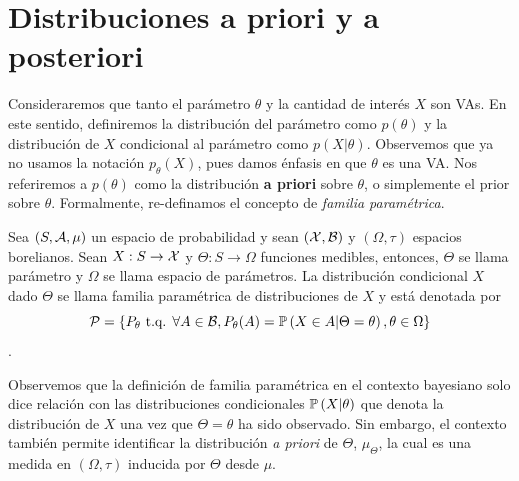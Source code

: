  \section{Distribuciones a priori y a posteriori} 
 \label{sec:distribuciones_a_priori_y_a_posteriori}
 
Consideraremos que tanto el parámetro $\theta$ y la cantidad de interés $X$ son VAs. En este sentido, definiremos la distribución del parámetro como $p(\theta)$ y la distribución de $X$ condicional al parámetro como $p(X|\theta)$. Observemos que ya no usamos la notación $p_\theta(X)$, pues damos énfasis en que $\theta$ es una VA. Nos referiremos a $p(\theta)$ como la distribución \textbf{a priori} sobre $\theta$, o simplemente el prior sobre $\theta$. Formalmente, re-definamos el concepto de \textit{familia paramétrica}. 

\begin{definition}
	\label{def:fam_par_bayes}
	Sea $(S,{\mathcal A},\mu)$ un espacio de probabilidad y sean $({\mathcal X},{\mathcal B})$ y $(\Omega, \tau)$ espacios borelianos. Sean $X:S\to{\mathcal X}$ y  $\Theta:S\to\Omega$ funciones medibles, entonces, $\Theta$ se llama parámetro y $\Omega$ se llama espacio de parámetros. La distribución condicional $X$ dado $\Theta$ se llama familia paramétrica de distribuciones de $X$ y está denotada por 
	\begin{equation}
		{\mathcal P} = \{P_\theta {\text{ t.q. }} \forall A\in{\mathcal B}, P_\theta(A) = \mathbb{P} \left(X\in A |  \Theta=\theta\right), \theta\in\Omega\}
	\end{equation}. 
\end{definition}

Observemos que la definición de familia paramétrica en el contexto bayesiano solo dice relación con las distribuciones condicionales $\mathbb{P} \left(X|\theta\right)$ que denota la distribución de $X$ una vez que $\Theta=\theta$ ha sido observado. Sin embargo, el contexto también permite identificar la distribución \textit{a priori} de $\Theta$, $\mu_\Theta$, la cual es una medida en $(\Omega,\tau)$ inducida por $\Theta$ desde $\mu$. 


